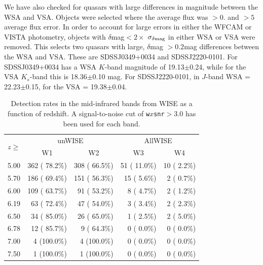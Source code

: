\documentclass[usenatbib]{mnras}
\begin{document}
  We have also checked for quasars with large differences in magnitude
  between the WSA and VSA. Objects were selected where the average flux
  was $>0.$ and $>5$ average flux error. In order to account for large
  errors in either the WFCAM or VISTA photometry, objects with $\delta$mag$
  < 2 \times$ $\sigma_{\delta\rm mag}$ in either WSA or VSA were removed. This
  selects two quasars with large, $\delta$mag $>0.2$mag differences
  between the WSA and VSA. These are SDSSJ0349+0034 and
  SDSSJ2220-0101. For SDSSJ0349+0034 has a WSA $K$-band magnitude of
  19.13$\pm$0.24, while for the VSA $K_s$-band this is 18.36$\pm$0.10
  mag. For SDSSJ2220-0101, in $J$-band WSA = 22.23$\pm$0.15, for the VSA
  = 19.38$\pm$0.04.

          
  
\begin{table}
  \centering
  \begin{tabular}{l r r r r}
    \hline \hline
    \multirow{ 2}{*}{$z \geq$} & \multicolumn{2}{c}{unWISE} &  \multicolumn{2}{c}{AllWISE}   \\ 
                                             & \multicolumn{1}{c}{W1} & \multicolumn{1}{c}{W2} & \multicolumn{1}{c}{W3} & \multicolumn{1}{c}{W4}  \\ 
    \hline
    5.00   &   362 ( 78.2\%)   &   308 ( 66.5\%)  &    51 ( 11.0\%)  &    10 (  2.2\%) \\ 
    5.70   &   186 ( 69.4\%)   &   151 ( 56.3\%)  &    15 (  5.6\%)  &     2 (  0.7\%) \\ 
    6.00   &   109 ( 63.7\%)   &    91 ( 53.2\%)  &     8 (  4.7\%)  &     2 (  1.2\%) \\ 
    6.19   &    63 ( 72.4\%)   &    47 ( 54.0\%)  &     3 (  3.4\%)  &     2 (  2.3\%) \\ 
    6.50   &    34 ( 85.0\%)   &    26 ( 65.0\%)  &     1 (  2.5\%)  &     2 (  5.0\%) \\ 
    6.78   &    12 ( 85.7\%)   &     9 ( 64.3\%)  &     0 (  0.0\%)  &     0 (  0.0\%) \\ 
    7.00   &     4 (100.0\%)   &     4 (100.0\%)  &     0 (  0.0\%)  &     0 (  0.0\%) \\ 
    7.50   &     1 (100.0\%)   &     1 (100.0\%)  &     0 (  0.0\%)  &     0 (  0.0\%) \\ 
    \hline \hline
  \end{tabular}
  \caption{Detection rates in the mid-infrared bands from WISE as a function of 
    redshift. A signal-to-noise cut of {\tt w$x$snr}$>3.0$ has been used for each band.}
  \label{tab:mir_detection}
\end{table}
\end{document}
